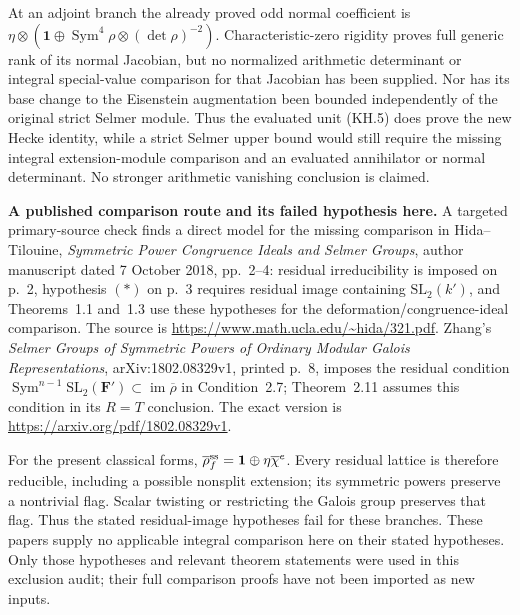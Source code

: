 \documentclass[11pt,a4paper]{article}
\theoremstyle{definition}
\renewcommand{\paragraph}[1]{\par\smallskip\noindent\textbf{#1}\quad\ignorespaces}
\begin{document}
At an adjoint branch the already proved odd normal coefficient
is $\eta\otimes(\mathbf1\oplus\operatorname{Sym}^4\rho
\otimes(\det\rho)^{-2})$.  Characteristic-zero rigidity proves
full generic rank of its normal Jacobian, but no normalized
arithmetic determinant or integral special-value comparison for
that Jacobian has been supplied.  Nor has its base change to the
Eisenstein augmentation been bounded independently of the
original strict Selmer module.  Thus the evaluated unit (KH.5)
does prove the new Hecke identity, while a strict Selmer upper
bound would still require the missing integral extension-module
comparison and an evaluated annihilator or normal determinant.
No stronger arithmetic vanishing conclusion is claimed.

\paragraph{A published comparison route and its failed hypothesis here.}
A targeted primary-source check finds a direct model for the
missing comparison in Hida--Tilouine, \emph{Symmetric Power
Congruence Ideals and Selmer Groups}, author manuscript dated
7 October 2018, pp.~2--4: residual irreducibility is imposed
on p.~2, hypothesis $(*)$ on p.~3 requires residual image
containing $\mathrm{SL}_2(k')$, and Theorems~1.1 and~1.3 use
these hypotheses for the deformation/congruence-ideal comparison.
The source is \url{https://www.math.ucla.edu/~hida/321.pdf}.
Zhang's \emph{Selmer Groups of Symmetric Powers of Ordinary
Modular Galois Representations}, arXiv:1802.08329v1, printed
p.~8, imposes the residual condition
$\operatorname{Sym}^{n-1}\mathrm{SL}_2(\mathbf F')
\subset\operatorname{im}\overline\rho$ in Condition~2.7;
Theorem~2.11 assumes this condition in its $R=T$ conclusion.
The exact version is
\url{https://arxiv.org/pdf/1802.08329v1}.

For the present classical forms,
$\overline\rho_f^{\rm ss}=\mathbf1\oplus\eta\overline\chi^e$.
Every residual lattice is therefore reducible, including a
possible nonsplit extension; its symmetric powers preserve
a nontrivial flag.  Scalar twisting or restricting the Galois
group preserves that flag.  Thus the stated residual-image
hypotheses fail for these branches.  These papers supply no
applicable integral comparison here on their stated hypotheses.
Only those hypotheses and relevant theorem statements were
used in this exclusion audit; their full comparison proofs
have not been imported as new inputs.

\end{document}
